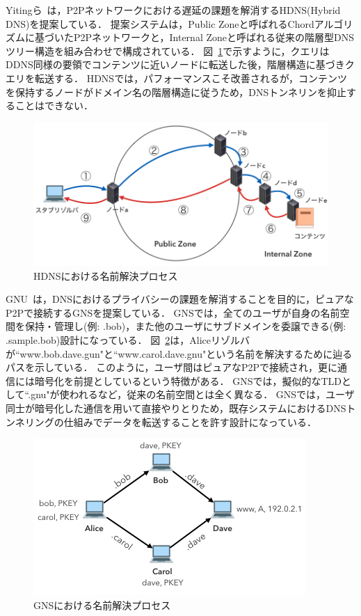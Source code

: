 Yitingら~\cite{yiting}は，P2Pネットワークにおける遅延の課題を解消するHDNS(Hybrid DNS)を提案している．
提案システムは，Public Zoneと呼ばれるChordアルゴリズムに基づいたP2Pネットワークと，Internal Zoneと呼ばれる従来の階層型DNSツリー構造を組み合わせで構成されている．
図~\ref{fig:hdns-mechanism}で示すように，クエリはDDNS同様の要領でコンテンツに近いノードに転送した後，階層構造に基づきクエリを転送する．
HDNSでは，パフォーマンスこそ改善されるが，コンテンツを保持するノードがドメイン名の階層構造に従うため，DNSトンネリンを抑止することはできない．
\begin{figure}[htbp]
 \centering
 \includegraphics[scale=0.6]{figure/hdns-mechanism.png}
 \caption{HDNSにおける名前解決プロセス}
 \label{fig:hdns-mechanism}
\end{figure}

GNU~\cite{gns}は，DNSにおけるプライバシーの課題を解消することを目的に，ピュアなP2Pで接続するGNSを提案している．
GNSでは，全てのユーザが自身の名前空間を保持・管理し(例: .bob)，また他のユーザにサブドメインを委譲できる(例: .sample.bob)設計になっている．
図~\ref{fig:gns-resolution}は，Aliceリゾルバが``www.bob.dave.gun"と``www.carol.dave.gnu"という名前を解決するために辿るパスを示している．
このように，ユーザ間はピュアなP2Pで接続され，更に通信には暗号化を前提としているという特徴がある．
GNSでは，擬似的なTLDとして``.gnu"が使われるなど，従来の名前空間とは全く異なる．
GNSでは，ユーザ同士が暗号化した通信を用いて直接やりとりため，既存システムにおけるDNSトンネリングの仕組みでデータを転送することを許す設計になっている．
\begin{figure}[htbp]
 \centering
 \includegraphics[scale=0.6]{figure/gns-resolution.png}
 \caption{GNSにおける名前解決プロセス}
 \label{fig:gns-resolution}
\end{figure}

